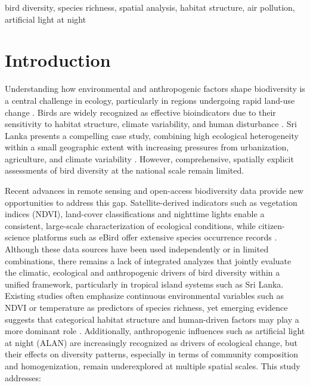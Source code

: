 \documentclass[conference]{IEEEtran}
\begin{document}
\begin{IEEEkeywords}
bird diversity, species richness, spatial analysis, habitat structure, air pollution, artificial light at night
\end{IEEEkeywords}

\section{Introduction}
Understanding how environmental and anthropogenic factors shape biodiversity is a central challenge in ecology, particularly in regions undergoing rapid land-use change \cite{ref20}. Birds are widely recognized as effective bioindicators due to their sensitivity to habitat structure, climate variability, and human disturbance \cite{ref21}. Sri Lanka presents a compelling case study, combining high ecological heterogeneity within a small geographic extent with increasing pressures from urbanization, agriculture, and climate variability \cite{ref1}. However, comprehensive, spatially explicit assessments of bird diversity at the national scale remain limited. 

Recent advances in remote sensing and open-access biodiversity data provide new opportunities to address this gap. Satellite-derived indicators such as vegetation indices (NDVI), land-cover classifications and nighttime lights enable a consistent, large-scale characterization of ecological conditions, while citizen-science platforms such as eBird offer extensive species occurrence records \cite{ref5,ref9}. Although these data sources have been used independently or in limited combinations, there remains a lack of integrated analyzes that jointly evaluate the climatic, ecological and anthropogenic drivers of bird diversity within a unified framework, particularly in tropical island systems such as Sri Lanka.
Existing studies often emphasize continuous environmental variables such as NDVI or temperature as predictors of species richness, yet emerging evidence suggests that categorical habitat structure and human-driven factors may play a more dominant role \cite{ref4,ref10}. Additionally, anthropogenic influences such as artificial light at night (ALAN) are increasingly recognized as drivers of ecological change, but their effects on diversity patterns, especially in terms of community composition and homogenization, remain underexplored at multiple spatial scales. This study addresses: 
 
\end{document}
